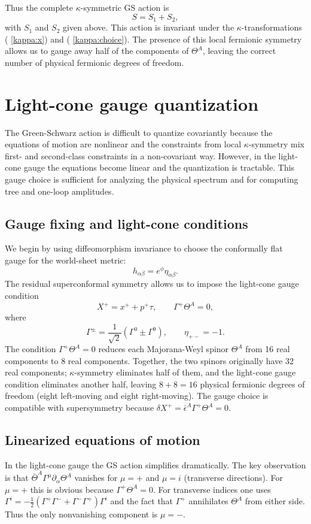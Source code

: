 \documentclass[12pt]{article}
\begin{document}
Thus the complete $\kappa$-symmetric GS action is
\[
S = S_1 + S_2,
\]
with $S_1$ and $S_2$ given above. This action is invariant under the $\kappa$-transformations ( \ref{kappa:x}) and ( \ref{kappa:choice}). The presence of this local fermionic symmetry allows us to gauge away half of the components of $\Theta^A$, leaving the correct number of physical fermionic degrees of freedom.

\section{Light-cone gauge quantization}

The Green-Schwarz action is difficult to quantize covariantly because the equations of motion are nonlinear and the constraints from local $\kappa$-symmetry mix first- and second-class constraints in a non-covariant way. However, in the light-cone gauge the equations become linear and the quantization is tractable. This gauge choice is sufficient for analyzing the physical spectrum and for computing tree and one-loop amplitudes.

\subsection{Gauge fixing and light-cone conditions}

We begin by using diffeomorphism invariance to choose the conformally flat gauge for the world-sheet metric:
\[
h_{\alpha\beta}=e^{\phi}\eta_{\alpha\beta}.
\]
The residual superconformal symmetry allows us to impose the light-cone gauge condition
\[
X^{+}=x^{+}+p^{+}\tau,\qquad \Gamma^{+}\Theta^{A}=0,
\]
where
\[
\Gamma^{\pm}=\frac{1}{\sqrt{2}}(\Gamma^{0}\pm\Gamma^{9}),\qquad \eta_{+-}=-1.
\]
The condition $\Gamma^{+}\Theta^{A}=0$ reduces each Majorana-Weyl spinor $\Theta^{A}$ from 16 real components to 8 real components. Together, the two spinors originally have 32 real components; $\kappa$-symmetry eliminates half of them, and the light-cone gauge condition eliminates another half, leaving $8+8=16$ physical fermionic degrees of freedom (eight left-moving and eight right-moving). The gauge choice is compatible with supersymmetry because $\delta X^{+}=\bar{\epsilon}^{A}\Gamma^{+}\Theta^{A}=0$.

\subsection{Linearized equations of motion}

In the light-cone gauge the GS action simplifies dramatically. The key observation is that $\bar{\Theta}^{A}\Gamma^{\mu}\partial_{\alpha}\Theta^{A}$ vanishes for $\mu=+$ and $\mu=i$ (transverse directions). For $\mu=+$ this is obvious because $\Gamma^{+}\Theta^{A}=0$. For transverse indices one uses $\Gamma^{i}=-\frac{1}{2}(\Gamma^{+}\Gamma^{-}+\Gamma^{-}\Gamma^{+})\Gamma^{i}$ and the fact that $\Gamma^{+}$ annihilates $\Theta^{A}$ from either side. Thus the only nonvanishing component is $\mu=-$.
\end{document}
